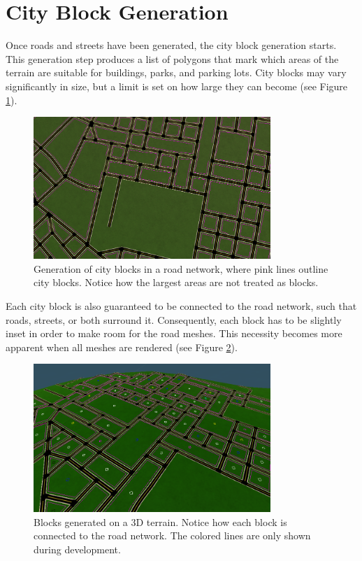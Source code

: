 \section{City Block Generation}

Once roads and streets have been generated, the city block generation starts.
This generation step produces a list of polygons that mark which areas of the terrain are suitable for buildings, parks, and parking lots.
City blocks may vary significantly in size, but a limit is set on how large they can become (see Figure \ref{fig:results_blockgen1}).

\begin{figure}[H]
  \centering

  \includegraphics[width=0.8\textwidth]{figure/results/blockgen1.png}
  \caption{Generation of city blocks in a road network, where pink lines outline city blocks. Notice how the largest areas are not treated as blocks.}

  \label{fig:results_blockgen1}
\end{figure}

Each city block is also guaranteed to be connected to the road network, such that roads, streets, or both surround it.
Consequently, each block has to be slightly inset in order to make room for the road meshes.
This necessity becomes more apparent when all meshes are rendered (see Figure \ref{fig:results_blockgen2}).

\begin{figure}[H]
  \centering

  \includegraphics[width=0.8\textwidth]{figure/results/blockgen2.png}
  \caption{Blocks generated on a 3D terrain. Notice how each block is connected to the road network. The colored lines are only shown during development.}

  \label{fig:results_blockgen2}
\end{figure}

